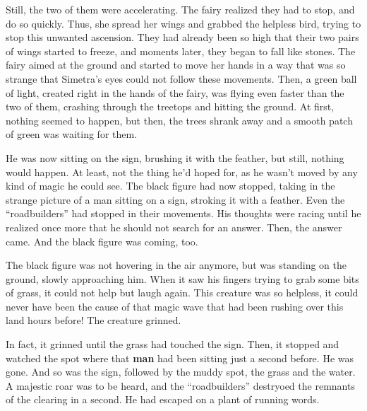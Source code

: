 Still, the two of them were accelerating. The fairy realized they had to stop, and do so quickly. Thus, she spread her wings and grabbed the helpless bird, trying to stop this unwanted ascension. They had already been so high that their two pairs of wings started to freeze, and moments later, they began to fall like stones. The fairy aimed at the ground and started to move her hands in a way that was so strange that Simetra's eyes could not follow these movements. Then, a green ball of light, created right in the hands of the fairy, was flying even faster than the two of them, crashing through the treetops and hitting the ground. At first, nothing seemed to happen, but then, the trees shrank away and a smooth patch of green was waiting for them. 

\froufrou{}

He was now sitting on the sign, brushing it with the feather, but still, nothing would happen. At least, not the thing he'd hoped for, as he wasn't moved by any kind of magic he could see. The black figure had now stopped, taking in the strange picture of a man sitting on a sign, stroking it with a feather. Even the \enquote{roadbuilders} had stopped in their movements.
His thoughts were racing until he realized once more that he should not search for an answer. Then, the answer came. And the black figure was coming, too.

\froufrou{}

The black figure was not hovering in the air anymore, but was standing on the ground, slowly approaching him. When it saw his fingers trying to grab some bits of grass, it could not help but laugh again. This creature was so helpless, it could never have been the cause of that magic wave that had been rushing over this land hours before! 
The creature grinned.

In fact, it grinned until the grass had touched the sign. Then, it stopped and watched the spot where that \textbf{man} had been sitting just a second before. 
He was gone. 
And so was the sign, followed by the muddy spot, the grass and the water. A majestic roar was to be heard, and the \enquote{roadbuilders} destryoed the remnants of the clearing in a second.
He had escaped on a plant of running words.

